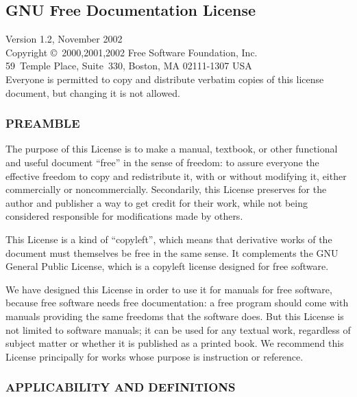 \documentclass[a4paper,german,10pt,twoside]{book}
\begin{document}
{\begin{appendix}

\chapter{GNU Free Documentation License} \label{GNU_Free_Documentation_License}

{ \small \sffamily
\renewcommand{\LaTeX}{LaTeX}

 \begin{flushleft}
 Version 1.2, November 2002\\[.5ex]
 Copyright \copyright\ 2000,2001,2002  Free Software Foundation, Inc.\\
	 59~Temple Place, Suite~330, Boston, MA	 02111-1307	 USA\\[.5ex]
 Everyone is permitted to copy and distribute verbatim copies
 of this license document, but changing it is not allowed.
 \end{flushleft}


\subsection*{PREAMBLE}

The purpose of this License is to make a manual, textbook, or other functional and useful document
``free'' in the sense of freedom: to assure everyone the effective freedom to copy and redistribute
it, with or without modifying it, either commercially or noncommercially. Secondarily, this License
preserves for the author and publisher a way to get credit for their work, while not being
considered responsible for modifications made by others.

This License is a kind of ``copyleft'', which means that derivative works of the document must
themselves be free in the same sense.  It complements the GNU General Public License, which is a
copyleft license designed for free software.

We have designed this License in order to use it for manuals for free software, because free
software needs free documentation: a free program should come with manuals providing the same
freedoms that the software does.  But this License is not limited to software manuals; it can be
used for any textual work, regardless of subject matter or whether it is published as a printed
book.  We recommend this License principally for works whose purpose is instruction or reference.


\subsection*{APPLICABILITY AND DEFINITIONS}
\label{applicability}

}
\end{appendix}}
\end{document}
